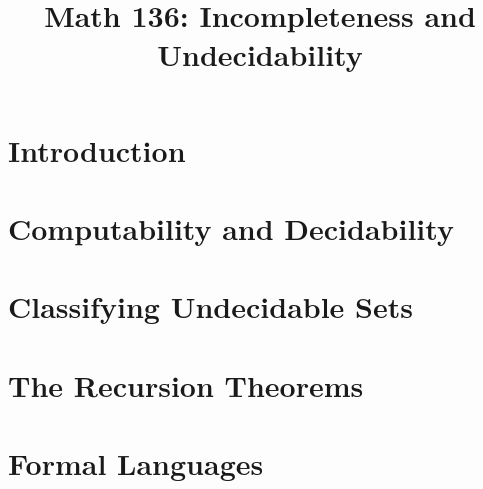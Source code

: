 \documentclass[oneside]{book}
\theoremstyle{definition}
\begin{document}
\title{Math 136: Incompleteness and Undecidability}
\frontmatter
\maketitle
\tableofcontents
\mainmatter
\chapter{Introduction}

\chapter{Computability and Decidability}

\chapter{Classifying Undecidable Sets}

\chapter{The Recursion Theorems}

\chapter{Formal Languages}
\end{document}
